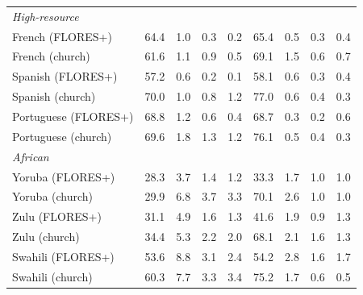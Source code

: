 \begin{table}[htbp]
\begin{tabular}{lrrrrrrrr}
\multicolumn{9}{l}{\textit{High-resource}} \\
French (FLORES+) & 64.4 & \cellcolor{loss!7}1.0 & \cellcolor{loss!2}0.3 & \cellcolor{loss!1}0.2 & 65.4 & \cellcolor{loss!3}0.5 & \cellcolor{loss!2}0.3 & \cellcolor{loss!3}0.4 \\
French (church) & 61.6 & \cellcolor{loss!8}1.1 & \cellcolor{loss!6}0.9 & \cellcolor{loss!3}0.5 & 69.1 & \cellcolor{loss!10}1.5 & \cellcolor{loss!4}0.6 & \cellcolor{loss!5}0.7 \\
Spanish (FLORES+) & 57.2 & \cellcolor{loss!4}0.6 & \cellcolor{loss!1}0.2 & \cellcolor{loss!0}0.1 & 58.1 & \cellcolor{loss!4}0.6 & \cellcolor{loss!2}0.3 & \cellcolor{loss!2}0.4 \\
Spanish (church) & 70.0 & \cellcolor{loss!7}1.0 & \cellcolor{loss!5}0.8 & \cellcolor{loss!8}1.2 & 77.0 & \cellcolor{loss!4}0.6 & \cellcolor{loss!2}0.4 & \cellcolor{loss!2}0.3 \\
Portuguese (FLORES+) & 68.8 & \cellcolor{loss!8}1.2 & \cellcolor{loss!4}0.6 & \cellcolor{loss!3}0.4 & 68.7 & \cellcolor{loss!2}0.3 & \cellcolor{loss!1}0.2 & \cellcolor{loss!4}0.6 \\
Portuguese (church) & 69.6 & \cellcolor{loss!12}1.8 & \cellcolor{loss!9}1.3 & \cellcolor{loss!8}1.2 & 76.1 & \cellcolor{loss!3}0.5 & \cellcolor{loss!3}0.4 & \cellcolor{loss!2}0.3 \\
\midrule \multicolumn{9}{l}{\textit{African}} \\
Yoruba (FLORES+) & 28.3 & \cellcolor{loss!25}3.7 & \cellcolor{loss!10}1.4 & \cellcolor{loss!8}1.2 & 33.3 & \cellcolor{loss!12}1.7 & \cellcolor{loss!7}1.0 & \cellcolor{loss!7}1.0 \\
Yoruba (church) & 29.9 & \cellcolor{loss!46}6.8 & \cellcolor{loss!25}3.7 & \cellcolor{loss!23}3.3 & 70.1 & \cellcolor{loss!18}2.6 & \cellcolor{loss!7}1.0 & \cellcolor{loss!7}1.0 \\
Zulu (FLORES+) & 31.1 & \cellcolor{loss!33}4.9 & \cellcolor{loss!11}1.6 & \cellcolor{loss!9}1.3 & 41.6 & \cellcolor{loss!13}1.9 & \cellcolor{loss!6}0.9 & \cellcolor{loss!9}1.3 \\
Zulu (church) & 34.4 & \cellcolor{loss!36}5.3 & \cellcolor{loss!15}2.2 & \cellcolor{loss!13}2.0 & 68.1 & \cellcolor{loss!15}2.1 & \cellcolor{loss!11}1.6 & \cellcolor{loss!9}1.3 \\
Swahili (FLORES+) & 53.6 & \cellcolor{loss!60}8.8 & \cellcolor{loss!21}3.1 & \cellcolor{loss!16}2.4 & 54.2 & \cellcolor{loss!19}2.8 & \cellcolor{loss!11}1.6 & \cellcolor{loss!12}1.7 \\
Swahili (church) & 60.3 & \cellcolor{loss!53}7.7 & \cellcolor{loss!23}3.3 & \cellcolor{loss!23}3.4 & 75.2 & \cellcolor{loss!12}1.7 & \cellcolor{loss!4}0.6 & \cellcolor{loss!3}0.5 \\

\end{tabular}
\end{table}
